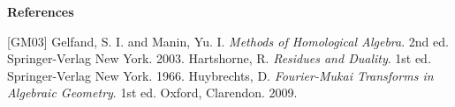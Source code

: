 \vspace{\baselineskip}
\begin{center}
    \large\bfseries References\normalsize
\end{center}
[GM03] Gelfand, S. I. and Manin, Yu. I. \textit{Methods of Homological Algebra}. 2nd ed. Springer-Verlag New York. 2003.
\newline
[Har66] Hartshorne, R. \textit{Residues and Duality}. 1st ed. Springer-Verlag New York. 1966.
\newline
[Huy09] Huybrechts, D. \textit{Fourier-Mukai Transforms in Algebraic Geometry}. 1st ed. Oxford, Clarendon. 2009.